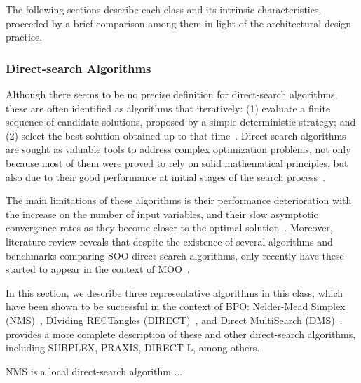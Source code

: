 	The following sections describe each class and its intrinsic characteristics, proceeded by a brief comparison among them in light of the architectural design practice. 	
	
	\subsubsection{Direct-search Algorithms}
	\label{ssec:direct-search}
	
	Although there seems to be no precise definition for direct-search algorithms, these are often identified as algorithms that iteratively: (1) evaluate a finite sequence of candidate solutions, proposed by a simple deterministic strategy; and (2) select the best solution obtained up to that time~\cite{Kolda2003,Wortmann2016BBO}. Direct-search algorithms are sought as valuable tools to address complex optimization problems, not only because most of them were proved to rely on solid mathematical principles, but also due to their good performance at initial stages of the search process~\cite{Rios2013}. 
	
	The main limitations of these algorithms is their performance deterioration with the increase on the number of input variables, and their slow asymptotic convergence rates as they become closer to the optimal solution~\cite{Kolda2003}. Moreover, literature review reveals that despite the existence of several algorithms and benchmarks comparing \ac{SOO} direct-search algorithms, only recently have these started to appear in the context of \ac{MOO}~\cite{Custodio2010,Custodio2018}. 
	
	In this section, we describe three representative algorithms in this class, which have been shown to be successful in the context of \ac{BPO}: Nelder-Mead Simplex (NMS)~\cite{Nelder1964}, DIviding RECTangles (DIRECT)~\cite{Jones1993DIRECT}, and Direct MultiSearch (DMS)~\cite{Custodio2010}.  provides a more complete description of these and other direct-search algorithms, including SUBPLEX, PRAXIS, DIRECT-L, among others.
	
	NMS is a local direct-search algorithm ...
	
